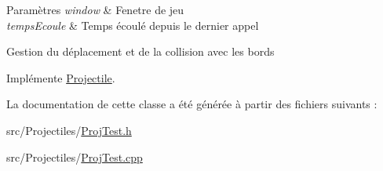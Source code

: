 \begin{DoxyParams}{Paramètres}
{\em window} & Fenetre de jeu \\
\hline
{\em temps\+Ecoule} & Temps écoulé depuis le dernier appel\\
\hline
\end{DoxyParams}
Gestion du déplacement et de la collision avec les bords 

Implémente \hyperlink{class_projectile_a09e02b793473660fc59a329a4dfea0ec}{Projectile}.



La documentation de cette classe a été générée à partir des fichiers suivants \+:\begin{DoxyCompactItemize}
\item 
src/\+Projectiles/\hyperlink{_proj_test_8h}{Proj\+Test.\+h}\item 
src/\+Projectiles/\hyperlink{_proj_test_8cpp}{Proj\+Test.\+cpp}\end{DoxyCompactItemize}
